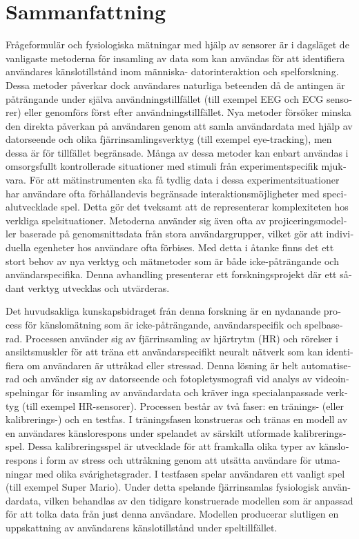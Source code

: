 \chapter*{Sammanfattning}

\begin{otherlanguage}{swedish}

Frågeformulär och fysiologiska mätningar med hjälp av sensorer är i dagsläget de vanligaste metoderna för insamling av data som kan användas för att identifiera användares känslotillstånd inom människa- datorinteraktion och spelforskning. Dessa metoder påverkar dock användares naturliga beteenden då de antingen är påträngande under själva användningstillfället (till exempel EEG och ECG sensorer) eller genomförs först efter användningstillfället. Nya metoder försöker minska den direkta påverkan på användaren genom att samla användardata med hjälp av datorseende och olika fjärrinsamlingsverktyg (till exempel eye-tracking), men dessa är för tillfället begränsade. Många av dessa metoder kan enbart användas i omsorgsfullt kontrollerade situationer med stimuli från experimentspecifik mjukvara. För att mätinstrumenten ska få tydlig data i dessa experimentsituationer har användare ofta förhållandevis begränsade interaktionsmöjligheter med specialutvecklade spel. Detta gör det tveksamt att de representerar komplexiteten hos verkliga spelsituationer. Metoderna använder sig även ofta av projiceringsmodeller baserade på genomsnittsdata från stora användargrupper, vilket gör att individuella egenheter hos användare ofta förbises. Med detta i åtanke finns det ett stort behov av nya verktyg och mätmetoder som är både icke-påträngande och användarspecifika. Denna avhandling presenterar ett forskningsprojekt där ett sådant verktyg utvecklas och utvärderas.

Det huvudsakliga kunskapsbidraget från denna forskning är en nydanande process för känslomätning som är icke-påträngande, användarspecifik och spelbaserad. Processen använder sig av fjärrinsamling av hjärtrytm (HR) och rörelser i ansiktsmuskler för att träna ett användarspecifikt neuralt nätverk som kan identifiera om användaren är uttråkad eller stressad. Denna lösning är helt automatiserad och använder sig av datorseende och fotopletysmografi vid analys av videoinspelningar för insamling av användardata och kräver inga specialanpassade verktyg (till exempel HR-sensorer). Processen består av två faser: en tränings- (eller kalibrerings-) och en testfas. I träningsfasen konstrueras och tränas en modell av en användares känslorespons under spelandet av särskilt utformade kalibreringsspel. Dessa kalibreringsspel är utvecklade för att framkalla olika typer av känslorespons i form av stress och uttråkning genom att utsätta användare för utmaningar med olika svårighetsgrader. I testfasen spelar användaren ett vanligt spel (till exempel Super Mario). Under detta spelande fjärrinsamlas fysiologisk användardata, vilken behandlas av den tidigare konstruerade modellen som är anpassad för att tolka data från just denna användare. Modellen producerar slutligen en uppskattning av användarens känslotillstånd under speltillfället.


\end{otherlanguage}
